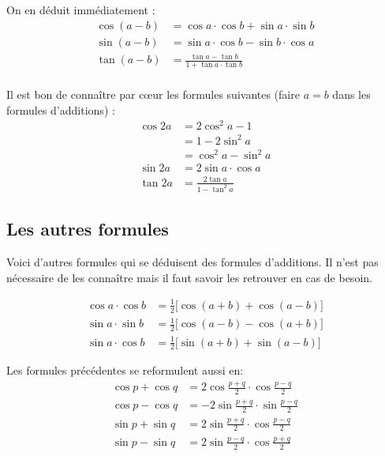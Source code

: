 \documentclass[class=report,crop=false]{standalone}
\begin{document}
On en déduit immédiatement :
\begin{align*}
\cos(a-b)&=\cos a\cdot\cos b + \sin a\cdot\sin b\\
\sin(a-b)&=\sin a\cdot\cos b  - \sin b\cdot\cos a \\
\tan (a-b)&=\frac{\tan a - \tan b}{1+\tan a\cdot\tan b} \\
\end{align*}



Il est bon de connaître par c\oe ur les formules suivantes (faire $a=b$ dans les formules d'additions) :
\begin{align*}
\cos 2a &= 2\cos^2a-1\\
    &= 1-2\sin^2a\\
    &=\cos^2a-\sin^2a\\
\sin 2a &= 2\sin a\cdot \cos a\\
\tan 2a &= \frac{2\tan a}{1-\tan^2 a}
\end{align*}

\subsection{Les autres formules}

Voici d'autres formules qui se déduisent des formules d'additions.
Il n'est pas nécessaire de les connaître mais il faut savoir 
les retrouver en cas de besoin.

\begin{align*}
\cos a\cdot\cos b &= \frac{1}{2}\big[ \cos(a+b)+\cos(a-b)\big]\\
\sin a\cdot\sin b &= \frac{1}{2}\big[ \cos(a-b)-\cos(a+b)\big]\\
\sin a\cdot\cos b &= \frac{1}{2}\big[ \sin(a+b)+\sin(a-b)\big]
\end{align*}



Les formules précédentes se reformulent aussi en:
\begin{align*}
\cos p+\cos q &= 2\cos \frac{p+q}{2}\cdot\cos\frac{p-q}{2}\\
\cos p-\cos q &= -2\sin \frac{p+q}{2}\cdot\sin \frac{p-q}{2}\\
\sin p+\sin q &= 2\sin \frac{p+q}{2}\cdot\cos\frac{p-q}{2}\\
\sin p-\sin q &= 2\sin \frac{p-q}{2}\cdot\cos\frac{p+q}{2}\\
\end{align*}
\end{document}
